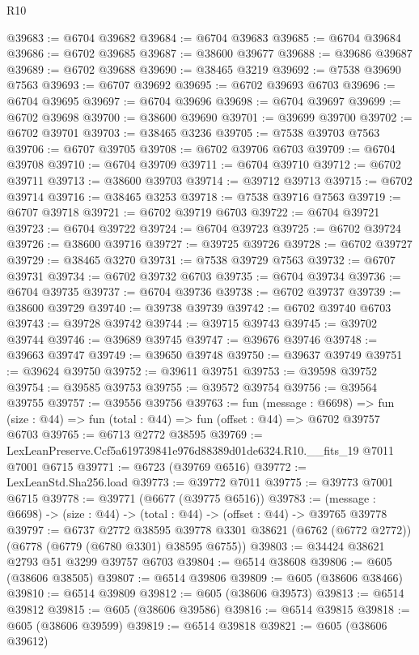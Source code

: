 \begin{lexlean}{R10}
\begin{coremodule}
@39683 := @6704 @39682
@39684 := @6704 @39683
@39685 := @6704 @39684
@39686 := @6702 @39685
@39687 := @38600 @39677
@39688 := @39686 @39687
@39689 := @6702 @39688
@39690 := @38465 @3219
@39692 := @7538 @39690 @7563
@39693 := @6707 @39692
@39695 := @6702 @39693 @6703
@39696 := @6704 @39695
@39697 := @6704 @39696
@39698 := @6704 @39697
@39699 := @6702 @39698
@39700 := @38600 @39690
@39701 := @39699 @39700
@39702 := @6702 @39701
@39703 := @38465 @3236
@39705 := @7538 @39703 @7563
@39706 := @6707 @39705
@39708 := @6702 @39706 @6703
@39709 := @6704 @39708
@39710 := @6704 @39709
@39711 := @6704 @39710
@39712 := @6702 @39711
@39713 := @38600 @39703
@39714 := @39712 @39713
@39715 := @6702 @39714
@39716 := @38465 @3253
@39718 := @7538 @39716 @7563
@39719 := @6707 @39718
@39721 := @6702 @39719 @6703
@39722 := @6704 @39721
@39723 := @6704 @39722
@39724 := @6704 @39723
@39725 := @6702 @39724
@39726 := @38600 @39716
@39727 := @39725 @39726
@39728 := @6702 @39727
@39729 := @38465 @3270
@39731 := @7538 @39729 @7563
@39732 := @6707 @39731
@39734 := @6702 @39732 @6703
@39735 := @6704 @39734
@39736 := @6704 @39735
@39737 := @6704 @39736
@39738 := @6702 @39737
@39739 := @38600 @39729
@39740 := @39738 @39739
@39742 := @6702 @39740 @6703
@39743 := @39728 @39742
@39744 := @39715 @39743
@39745 := @39702 @39744
@39746 := @39689 @39745
@39747 := @39676 @39746
@39748 := @39663 @39747
@39749 := @39650 @39748
@39750 := @39637 @39749
@39751 := @39624 @39750
@39752 := @39611 @39751
@39753 := @39598 @39752
@39754 := @39585 @39753
@39755 := @39572 @39754
@39756 := @39564 @39755
@39757 := @39556 @39756
@39763 := fun (message : @6698) =>
  fun (size : @44) => fun (total : @44) => fun (offset : @44) => @6702 @39757 @6703
@39765 := @6713 @2772 @38595
@39769 := LexLeanPreserve.Ccf5a619739841e976d88389d01de6324.R10.__fits_19 @7011 @7001 @6715
@39771 := @6723 (@39769 @6516)
@39772 := LexLeanStd.Sha256.load
@39773 := @39772 @7011
@39775 := @39773 @7001 @6715
@39778 := @39771 (@6677 (@39775 @6516))
@39783 := (message : @6698) -> (size : @44) -> (total : @44) -> (offset : @44) -> @39765 @39778
@39797 := @6737
    @2772
    @38595
    @39778
    @3301
    @38621
    (@6762 (@6772 @2772))
    (@6778 (@6779 (@6780 @3301) @38595 @6755))
@39803 := @34424 @38621 @2793 @51 @3299 @39757 @6703
@39804 := @6514 @38608
@39806 := @605 (@38606 @38505)
@39807 := @6514 @39806
@39809 := @605 (@38606 @38466)
@39810 := @6514 @39809
@39812 := @605 (@38606 @39573)
@39813 := @6514 @39812
@39815 := @605 (@38606 @39586)
@39816 := @6514 @39815
@39818 := @605 (@38606 @39599)
@39819 := @6514 @39818
@39821 := @605 (@38606 @39612)

\end{coremodule}
\end{lexlean}
